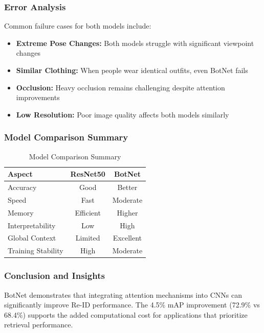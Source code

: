 \documentclass[a4paper,12pt]{article}
\begin{document}
\subsubsection*{Error Analysis}
Common failure cases for both models include:

\begin{itemize}
    \item \textbf{Extreme Pose Changes:} Both models struggle with significant viewpoint changes
    \item \textbf{Similar Clothing:} When people wear identical outfits, even BotNet fails
    \item \textbf{Occlusion:} Heavy occlusion remains challenging despite attention improvements
    \item \textbf{Low Resolution:} Poor image quality affects both models similarly
\end{itemize}

\subsubsection*{Model Comparison Summary}
\begin{table}[H]
    \centering
    \begin{tabular}{lcc}
        \toprule
        \textbf{Aspect} & \textbf{ResNet50} & \textbf{BotNet} \\
        \midrule
        Accuracy & Good & Better \\
        Speed & Fast & Moderate \\
        Memory & Efficient & Higher \\
        Interpretability & Low & High \\
        Global Context & Limited & Excellent \\
        Training Stability & High & Moderate \\
        \bottomrule
    \end{tabular}
    \caption{Model Comparison Summary}
\end{table}

\subsubsection*{Conclusion and Insights}
BotNet demonstrates that integrating attention mechanisms into CNNs can significantly improve Re-ID performance. The 4.5\% mAP improvement (72.9\% vs 68.4\%) supports the added computational cost for applications that prioritize retrieval performance.
\end{document}

